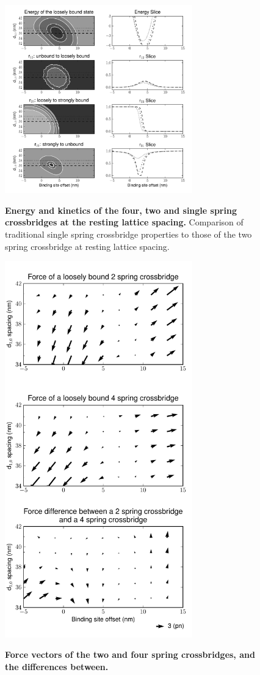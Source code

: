 \documentclass[]{article}
\begin{document}
\begin{figure}[htbp]
    \begin{center}
    \includegraphics[width=3.2in]{../imgs/Figure3.pdf}
    \label{fig:4s}
    \caption{
        \textbf{Energy and kinetics of the four, two and single spring crossbridges at the resting lattice spacing.}
        Comparison of traditional single spring crossbridge properties to those of the two spring crossbridge at resting lattice spacing.
    }
    \end{center}
\end{figure}

\begin{figure}[htbp]
    \begin{center}
    \includegraphics[width=3.2in]{../imgs/Figure4.pdf}
    \label{fig:force}
    \caption{
        \textbf{Force vectors of the two and four spring crossbridges, and the differences between.}        
    }
    \end{center}
\end{figure}
\end{document}

